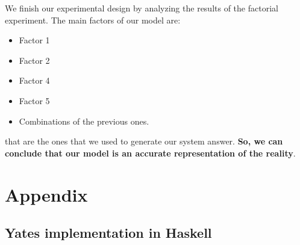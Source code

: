 \documentclass[12pt, a4paper]{article} %
\theoremstyle{definition}
\begin{document}
We finish our experimental design by analyzing the results of the factorial experiment. The main factors of our model are:

\begin{itemize}
  \item Factor 1
  \item Factor 2
  \item Factor 4
  \item Factor 5
  \item Combinations of the previous ones.
\end{itemize}

that are the ones that we used to generate our system answer. \textbf{So, we can conclude that our model is an accurate representation of the reality}.



\newpage
\section*{Appendix}\label{s:appendix}

\subsection*{Yates implementation in Haskell}%
\label{sub:Yates implementation in Haskell}

\inputminted{haskell}{../ex4/Main.hs}\label{listing:4}
\end{document}
